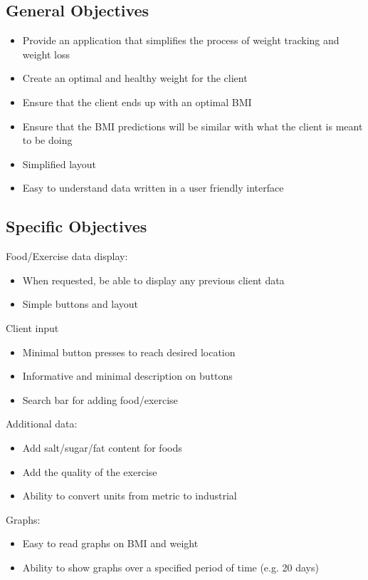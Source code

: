 \subsection{General Objectives}

\begin{itemize}
\item Provide an application that simplifies the process of weight tracking and weight loss
\item Create an optimal and healthy weight for the client
\item Ensure that the client ends up with an optimal BMI
\item Ensure that the BMI predictions will be similar with what the client is meant to be doing
\item Simplified layout
\item Easy to understand data written in a user friendly interface
\end{itemize}

\subsection{Specific Objectives}
Food/Exercise data display:

\begin{itemize}
\item When requested, be able to display any previous client data
\item Simple buttons and layout 
\end{itemize}

Client input
\begin{itemize}
\item Minimal button presses to reach desired location
\item Informative and minimal description on buttons
\item Search bar for adding food/exercise
\end{itemize}

Additional data:
\begin{itemize}
\item Add salt/sugar/fat content for foods
\item Add the quality of the exercise
\item Ability to convert units from metric to industrial
\end{itemize}

Graphs:
\begin{itemize}
\item Easy to read graphs on BMI and weight
\item Ability to show graphs over a specified period of time (e.g. 20 days)
\end{itemize}

